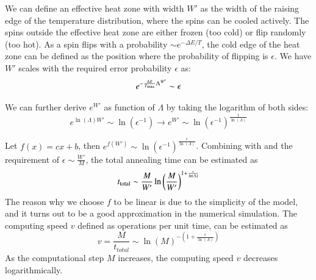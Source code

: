 \documentclass[twocolumn,superscriptaddress,english,showpacs,longbibliography]{revtex4-2}
\newcommand{\jinguo}[1]{[{\color{blue}{JGL: #1}}]}
\newcommand{\ym}[1]{[{\color{red}{YM: #1}}]}
\begin{document}
We can define an effective heat zone with width $W'$ as the width of the raising edge of the temperature distribution, where the spins can be cooled actively.
The spins outside the effective heat zone are either frozen (too cold) or flip randomly (too hot).
As a spin flips with a probability $\sim e^{-\Delta E/T}$, the cold edge of the heat zone can be defined as the position where the probability of flipping is $\epsilon$.
We have $W'$ scales with the required error probability $\epsilon$ as:
\begin{equation}
    e^{-\frac{\Delta E}{T_{\rm max}}\Lambda^{W'}} \sim \epsilon
\end{equation}

We can further derive $e^{W'}$ as function of $\Lambda$ by taking the logarithm of both sides:
\begin{equation}
    e^{\ln(\Lambda)W'}\sim \ln(\epsilon^{-1})\rightarrow e^{W'}\sim \ln(\epsilon^{-1})^{\frac{1}{\ln(\Lambda)}}
\end{equation}

Let $f(x) = c x + b$, then $e^{f(W')} \sim \ln(\epsilon^{-1})^{\frac{c}{\ln(\Lambda)}}$.
Combining with  and the requirement of $\epsilon \sim \frac{W'}{M}$, the total annealing time can be estimated as
\begin{equation}
    \label{eq:total-annealing-time}
    t_{\rm total} \sim \frac{M}{W'}\ln\left(\frac{M}{W'}\right)^{1+ \frac{c}{\ln(\Lambda)}}
\end{equation}
The reason why we choose $f$ to be linear is due to the simplicity of the model, and it turns out to be a good approximation in the numerical simulation.
The computing speed $v$ defined as operations per unit time, can be estimated as
\begin{equation}
    \label{eq:moving-speed}
    v = \frac{M}{t_{total}} \sim \ln(M)^{-(1 + \frac{c}{\ln(\Lambda)})}
\end{equation}
As the computational step $M$ increases, the computing speed $v$ decreases logarithmically.
\end{document}
